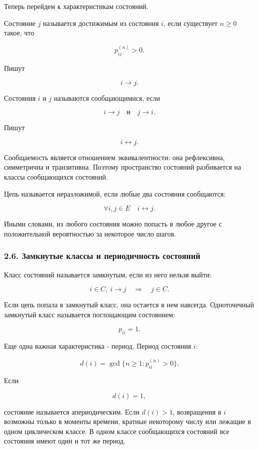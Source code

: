 \documentclass[
  11pt,
  a4paper,
]{article}
\begin{document}
Теперь перейдем к характеристикам состояний.

Состояние \(j\) называется достижимым из состояния \(i\), если
существует \(n\ge0\) такое, что

\[
p_{ij}^{(n)}>0.
\]

Пишут

\[
i\to j.
\]

Состояния \(i\) и \(j\) называются сообщающимися, если

\[
i\to j
\quad\text{и}\quad
j\to i.
\]

Пишут

\[
i\leftrightarrow j.
\]

Сообщаемость является отношением эквивалентности: она рефлексивна,
симметрична и транзитивна. Поэтому пространство состояний разбивается на
классы сообщающихся состояний.

Цепь называется неразложимой, если любые два состояния сообщаются:

\[
\forall i,j\in E
\quad
i\leftrightarrow j.
\]

Иными словами, из любого состояния можно попасть в любое другое с
положительной вероятностью за некоторое число шагов.

\subsubsection{2.6. Замкнутые классы и периодичность
состояний}\label{ux437ux430ux43cux43aux43dux443ux442ux44bux435-ux43aux43bux430ux441ux441ux44b-ux438-ux43fux435ux440ux438ux43eux434ux438ux447ux43dux43eux441ux442ux44c-ux441ux43eux441ux442ux43eux44fux43dux438ux439}

Класс состояний называется замкнутым, если из него нельзя выйти:

\[
i\in C,\ i\to j
\quad\Rightarrow\quad
j\in C.
\]

Если цепь попала в замкнутый класс, она остается в нем навсегда.
Одноточечный замкнутый класс называется поглощающим состоянием:

\[
p_{ii}=1.
\]

Еще одна важная характеристика - период. Период состояния \(i\):

\[
d(i)=\gcd\{n\ge1:p_{ii}^{(n)}>0\}.
\]

Если

\[
d(i)=1,
\]

состояние называется апериодическим. Если \(d(i)>1\), возвращения в
\(i\) возможны только в моменты времени, кратные некоторому числу или
лежащие в одном циклическом классе. В одном классе сообщающихся
состояний все состояния имеют один и тот же период.
\end{document}
